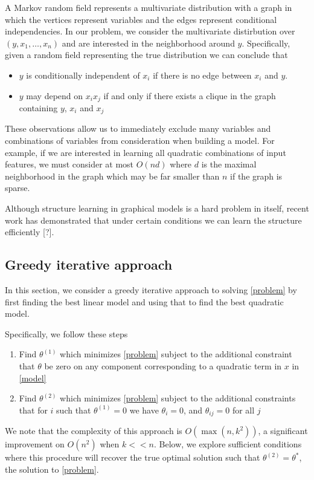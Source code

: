 \documentclass[12pt]{article}
\begin{document}
A Markov random field represents a multivariate distribution with a graph in which the vertices represent variables and the edges represent conditional independencies. In our problem, we consider the multivariate distirbution over $(y,x_1,\ldots,x_n)$ and are interested in the neighborhood around $y$. Specifically, given a random field representing the true distribution we can conclude that
\begin{itemize}
\item $y$ is conditionally independent of $x_i$ if there is no edge between $x_i$ and $y$.
\item $y$ may depend on $x_ix_j$ if and only if there exists a clique in the graph containing $y$, $x_i$ and $x_j$
\end{itemize}
These observations allow us to immediately exclude many variables and combinations of variables from consideration when building a model. For example, if we are interested in learning all quadratic combinations of input features, we must consider at most $O(nd)$ where $d$ is the maximal neighborhood in the graph which may be far smaller than $n$ if the graph is sparse.

Although structure learning in graphical models is a hard problem in itself, recent work has demonstrated that under certain conditions we can learn the structure efficiently [?].

\subsection{Greedy iterative approach}

In this section, we consider a greedy iterative approach to solving \eqref{problem} by first finding the best linear model and using that to find the best quadratic model. 

Specifically, we follow these steps
\begin{enumerate}
\item Find $\theta^{(1)}$ which minimizes \eqref{problem} subject to the additional constraint that $\theta$ be zero on any component corresponding to a quadratic term in $x$ in \eqref{model}
\item Find $\theta^{(2)}$ which minimizes \eqref{problem} subject to the additional constraints that for $i$ such that $\theta^{(1)} = 0$ we have $\theta_i = 0$, and $\theta_{ij} = 0$ for all $j$ 
\end{enumerate}
We note that the complexity of this approach is $O(\max(n, k^2))$, a significant improvement on $O(n^2)$ when $k << n$. Below, we explore sufficient conditions where this procedure will recover the true optimal solution such that $\theta^{(2)} = \theta^*$, the solution to \eqref{problem}.
\end{document}
